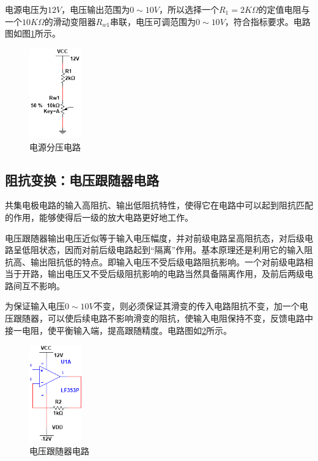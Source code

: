 \documentclass[12pt]{article}
\begin{document}
电源电压为$12V$，电压输出范围为$0 \sim 10 V$，所以选择一个$R_1=2 K\Omega $的定值电阻与一个$10 K\Omega$的滑动变阻器$R_{w1}$串联，电压可调范围为$0 \sim 10 V$，符合指标要求。电路图如图\ref{fig:fig1}所示。

\begin{figure}[htbp]
    \centering
    \includegraphics[width=0.2\textwidth]{fig/fig1.jpg}
    \caption{电源分压电路}
    \label{fig:fig1}
\end{figure}

\subsection{阻抗变换：电压跟随器电路}

共集电极电路的输入高阻抗、输出低阻抗特性，使得它在电路中可以起到阻抗匹配的作用，能够使得后一级的放大电路更好地工作。

电压跟随器输出电压近似等于输入电压幅度，并对前级电路呈高阻抗态，对后级电路呈低阻状态，因而对前后级电路起到“隔离”作用。基本原理还是利用它的输入阻抗高、输出阻抗低的特点。即输入电压不受后级电路阻抗影响。一个对前级电路相当于开路，输出电压又不受后级阻抗影响的电路当然具备隔离作用，及前后两级电路间互不影响。

为保证输入电压$0 \sim 10 V$不变，则必须保证其滑变的传入电路阻抗不变，加一个电压跟随器，可以使后续电路不影响滑变的阻抗，使输入电阻保持不变，反馈电路中接一电阻，使平衡输入端，提高跟随精度。电路图如\ref{fig:fig2}所示。

\begin{figure}[htbp]
    \centering
    \includegraphics[width=0.2\textwidth]{fig/fig2.jpg}
    \caption{电压跟随器电路}
    \label{fig:fig2}
\end{figure}
\end{document}
